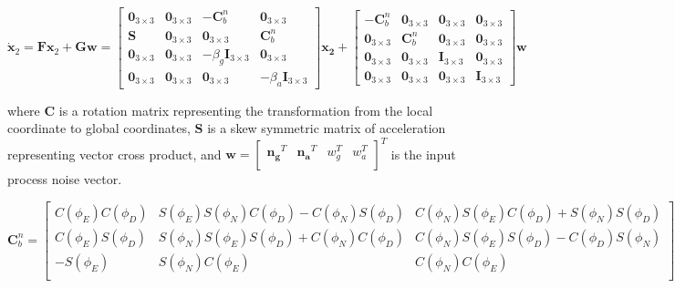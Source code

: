 \begin{equation}
  \boldsymbol{\dot{x}}_2 = \boldsymbol{F}\boldsymbol{x}_2 + \boldsymbol{G}\boldsymbol{w} = \begin{bmatrix}
        \boldsymbol{0}_{3\times3} & \boldsymbol{0}_{3\times3} & \boldsymbol{-C}^n_b & \boldsymbol{0}_{3\times3} \\
        \boldsymbol{S} & \boldsymbol{0}_{3\times3} & \boldsymbol{0}_{3\times3} & \boldsymbol{C}^n_b \\
        \boldsymbol{0}_{3\times3} & \boldsymbol{0}_{3\times3} & -\beta_g\boldsymbol{I}_{3\times3} & \boldsymbol{0}_{3\times3} \\
        \boldsymbol{0}_{3\times3} & \boldsymbol{0}_{3\times3} & \boldsymbol{0}_{3\times3} & -\beta_a\boldsymbol{I}_{3\times3}
      \end{bmatrix}\boldsymbol{x_2}
      +
      \begin{bmatrix}
        \boldsymbol{-C}^n_b & \boldsymbol{0}_{3\times3} & \boldsymbol{0}_{3\times3} & \boldsymbol{0}_{3\times3} \\
        \boldsymbol{0}_{3\times3} & \boldsymbol{C}^n_b & \boldsymbol{0}_{3\times3} & \boldsymbol{0}_{3\times3} \\
        \boldsymbol{0}_{3\times3} & \boldsymbol{0}_{3\times3} & \boldsymbol{I}_{3\times3} & \boldsymbol{0}_{3\times3} \\
        \boldsymbol{0}_{3\times3} & \boldsymbol{0}_{3\times3} & \boldsymbol{0}_{3\times3} & \boldsymbol{I}_{3\times3}
      \end{bmatrix}\boldsymbol{w}
\end{equation}

where $\boldsymbol{C}$ is a rotation matrix representing the transformation from the local coordinate 
to global coordinates, $\boldsymbol{S}$ is a skew symmetric matrix of acceleration representing
vector cross product, and $\boldsymbol{w} = 
\begin{bmatrix}
  \boldsymbol{n_g}^T & \boldsymbol{n_a}^T & w_g^T & w_a^T \\
\end{bmatrix}^T$ is the input process noise vector. 

\begin{equation}
  \boldsymbol{C}^n_b = \begin{bmatrix}
      C(\phi_E)C(\phi_D) & S(\phi_E) S(\phi_N) C(\phi_D) - C(\phi_N) S(\phi_D) & C(\phi_N) S(\phi_E) C(\phi_D) + S(\phi_N) S(\phi_D) \\
      C(\phi_E)S(\phi_D) & S(\phi_N) S(\phi_E) S(\phi_D) + C(\phi_N) C(\phi_D) & C(\phi_N) S(\phi_E) S(\phi_D) - C(\phi_D) S(\phi_N) \\
      -S(\phi_E) & S(\phi_N) C(\phi_E) & C(\phi_N) C(\phi_E) \\
      \end{bmatrix}
\end{equation}

